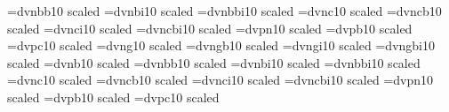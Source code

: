 \font\largednbomb=dvnbb10 scaled
\font\largednbomi=dvnbi10 scaled
\font\largednbombi=dvnbbi10 scaled
\font\largedncal=dvnc10 scaled
\font\largedncalb=dvncb10 scaled
\font\largedncali=dvnci10 scaled
\font\largedncalbi=dvncbi10 scaled
\font\largednp=dvpn10 scaled
\font\largednpbom=dvpb10 scaled
\font\largednpcal=dvpc10 scaled
\font\hugedn=dvng10 scaled
\font\hugednb=dvngb10 scaled
\font\hugedni=dvngi10 scaled
\font\hugednbi=dvngbi10 scaled
\font\hugednbom=dvnb10 scaled
\font\hugednbomb=dvnbb10 scaled
\font\hugednbomi=dvnbi10 scaled
\font\hugednbombi=dvnbbi10 scaled
\font\hugedncal=dvnc10 scaled
\font\hugedncalb=dvncb10 scaled
\font\hugedncali=dvnci10 scaled
\font\hugedncalbi=dvncbi10 scaled
\font\hugednp=dvpn10 scaled
\font\hugednpbom=dvpb10 scaled
\font\hugednpcal=dvpc10 scaled
%
%
